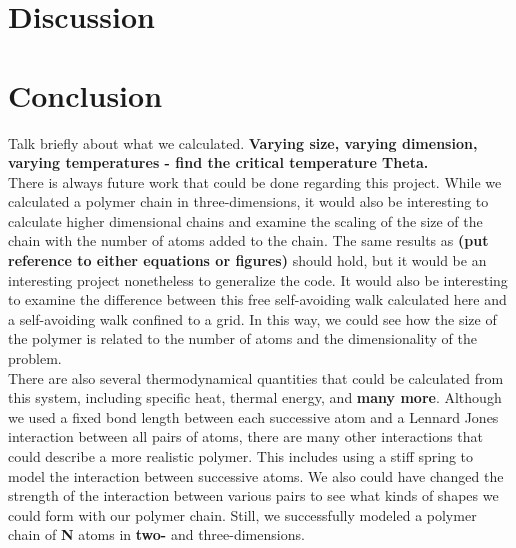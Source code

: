 \documentclass{article}
\begin{document}
\begin{multicols}{2}
\section{Discussion}
\label{discuss}

\section{Conclusion}
\label{concl}

Talk briefly about what we calculated.  \textbf{Varying size, varying dimension, varying temperatures - find the critical temperature Theta.}\\

There is always future work that could be done regarding this project.  While we calculated a polymer chain in three-dimensions, it would also be interesting to calculate higher dimensional chains and examine the scaling of the size of the chain with the number of atoms added to the chain.  The same results as \textbf{(put reference to either equations or figures)} should hold, but it would be an interesting project nonetheless to generalize the code.  It would also be interesting to examine the difference between this free self-avoiding walk calculated here and a self-avoiding walk confined to a grid.  In this way, we could see how the size of the polymer is related to the number of atoms and the dimensionality of the problem.  \\

There are also several thermodynamical quantities that could be calculated from this system, including specific heat, thermal energy, and \textbf{many more}.  Although we used a fixed bond length between each successive atom and a Lennard Jones interaction between all pairs of atoms, there are many other interactions that could describe a more realistic polymer.  This includes using a stiff spring to model the interaction between successive atoms.  We also could have changed the strength of the interaction between various pairs to see what kinds of shapes we could form with our polymer chain.  Still, we successfully modeled a polymer chain of \textbf{N} atoms in \textbf{two-} and three-dimensions.  

\end{multicols}


\end{document}

